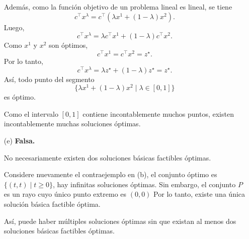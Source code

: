 \begin{enumerate}
    Además, como la función objetivo de un problema lineal es lineal, se tiene
    \[
    c^\top x^\lambda
    =
    c^\top\left(\lambda x^1+(1-\lambda)x^2\right).
    \]
    Luego,
    \[
    c^\top x^\lambda
    =
    \lambda c^\top x^1+(1-\lambda)c^\top x^2.
    \]
    Como \(x^1\) y \(x^2\) son óptimos,
    \[
    c^\top x^1=c^\top x^2=z^\star.
    \]
    Por lo tanto,
    \[
    c^\top x^\lambda
    =
    \lambda z^\star+(1-\lambda)z^\star
    =
    z^\star.
    \]
    Así, todo punto del segmento
    \[
    \{\lambda x^1+(1-\lambda)x^2\mid \lambda\in[0,1]\}
    \]
    es óptimo.

    Como el intervalo \([0,1]\) contiene incontablemente muchos puntos, existen incontablemente muchas soluciones óptimas.

    \item[(e)] \textbf{Falsa.}

    No necesariamente existen dos soluciones básicas factibles óptimas.

    Considere nuevamente el contraejemplo en (b), el conjunto óptimo es $\{(t,t)\mid t\geq 0\}$, hay infinitas soluciones óptimas. Sin embargo, el conjunto \(P\) es un rayo cuyo único punto extremo es $(0,0)$
    Por lo tanto, existe una única solución básica factible óptima.

    Así, puede haber múltiples soluciones óptimas sin que existan al menos dos soluciones básicas factibles óptimas.
    
\end{enumerate}
